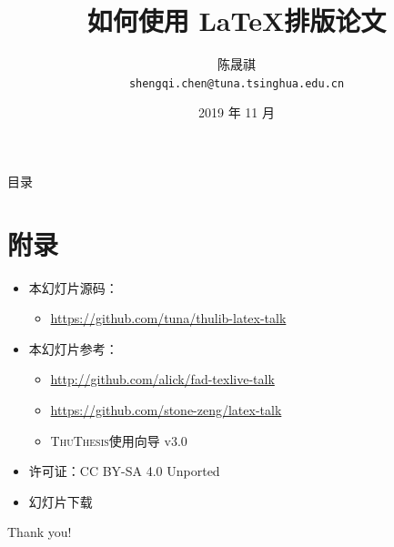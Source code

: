 \documentclass[xcolor=table,dvipsnames,svgnames,aspectratio=169,fontset=fandol,punct=kaiming]{ctexbeamer}
\title
{如何使用 \LaTeX 排版论文}
\author[陈晟祺] %
{陈晟祺\\ \texttt{shengqi.chen@tuna.tsinghua.edu.cn}}
\institute{清华大学 TUNA 协会}
\date[图书馆专题培训讲座]{2019 年 11 月}
\newcommand{\ThuThesis}{\textsc{ThuThesis}\xspace}
\newcommand\link[1]{\href{#1}{\faLink}}
\begin{document}
\begin{frame}
  \titlepage
\end{frame}

\begin{frame}{目录}
  \tableofcontents
\end{frame}









\section*{附录}


\begin{frame}
  \begin{itemize}
    \item 本幻灯片源码：
      \begin{itemize}
        \item \url{https://github.com/tuna/thulib-latex-talk}
      \end{itemize}
    \item 本幻灯片参考：
      \begin{itemize}
        \item \url{http://github.com/alick/fad-texlive-talk}
        \item \url{https://github.com/stone-zeng/latex-talk}
        \item \ThuThesis{}使用向导 v3.0
      \end{itemize}
    \item 许可证：CC BY-SA 4.0 Unported \ccbysa
    \item 幻灯片下载 \link{https://stu.cs.tsinghua.edu.cn/\~harry/latex-talk.pdf} \hspace{1em}
  \end{itemize}
\end{frame}

\begin{frame}
  \begin{center}
    {\Huge\calligra Thank you!}
  \end{center}
\end{frame}
\end{document}

